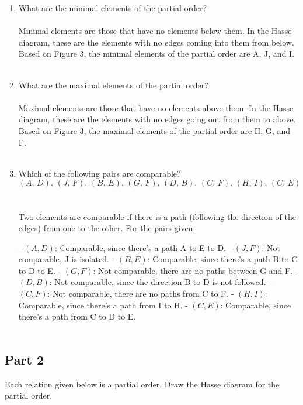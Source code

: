 \documentclass{amsart}
\theoremstyle{definition}
\theoremstyle{Exercise}
\theoremstyle{remark}
\theoremstyle{rule}
\numberwithin{equation}{section}
\begin{document}
\begin{enumerate}[label=(\alph*)]
\item What are the minimal elements of the partial order?\\\\
Minimal elements are those that have no elements below them. In the Hasse diagram, these are the elements with no edges coming into them from below. Based on Figure 3, the minimal elements of the partial order are A, J, and I.
\\\\

\item What are the maximal elements of the partial order?\\\\
Maximal elements are those that have no elements above them. In the Hasse diagram, these are the elements with no edges going out from them to above. Based on Figure 3, the maximal elements of the partial order are H, G, and F.
\\\\

\item Which of the following pairs are comparable?\\
\[
(A, \,D),\, (J,\, F),\, (B,\, E),\, (G, \,F),\, (D,\, B),\, (C, \,F),\, (H,\, I), \,(C,\, E)
\]\\\\
Two elements are comparable if there is a path (following the direction of the edges) from one to the other. For the pairs given:

- \( (A, D) \): Comparable, since there's a path A to E to D.
- \( (J, F) \): Not comparable, J is isolated.
- \( (B, E) \): Comparable, since there's a path B to C to D to E.
- \( (G, F) \): Not comparable, there are no paths between G and F.
- \( (D, B) \): Not comparable, since the direction B to D is not followed.
- \( (C, F) \): Not comparable, there are no paths from C to F.
- \( (H, I) \): Comparable, since there's a path from I to H.
- \( (C, E) \): Comparable, since there's a path from C to D to E.
\\\\

\end{enumerate}

\subsection*{Part 2}
Each relation given below is a partial order. Draw the Hasse diagram for the partial order.
\end{document}
